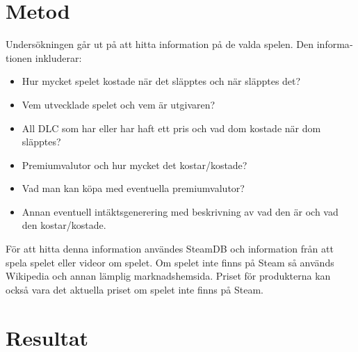 \documentclass[11p]{article}
\begin{document}
\begin{otherlanguage}{swedish}
\section{Metod}

     Undersökningen går ut på att hitta information på de valda spelen.
     Den informationen inkluderar:
     \begin{itemize}
         \item Hur mycket spelet kostade när det släpptes och när släpptes det?
         \item Vem utvecklade spelet och vem är utgivaren?
         \item All DLC som har eller har haft ett pris och vad dom kostade när dom släpptes?
         \item Premiumvalutor och hur mycket det kostar/kostade?
         \item Vad man kan köpa med eventuella premiumvalutor?
         \item Annan eventuell intäktsgenerering med beskrivning av vad den är och vad den kostar/kostade.
     \end{itemize}
    För att hitta denna information användes SteamDB och information från att spela spelet eller videor om spelet.
    Om spelet inte finns på Steam så används Wikipedia och annan lämplig marknadshemsida.
    Priset för produkterna kan också vara det aktuella priset om spelet inte finns på Steam.

\section{Resultat}




\end{otherlanguage}
\end{document}
